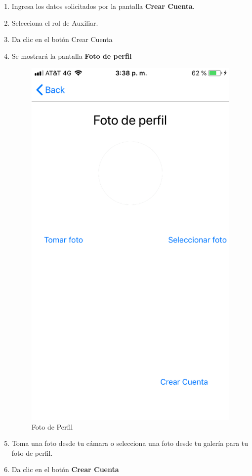 \begin{enumerate}
	\item Ingresa los datos solicitados por la pantalla \textbf{Crear Cuenta}.
	
	\item Selecciona el rol de Auxiliar.
	
	\item Da clic en el botón Crear Cuenta
	
	\item Se mostrará la pantalla \textbf{Foto de perfil}
	\newpage
	\begin{figure}[!htbp]			
		\hypertarget{fig:fotoPerfil}{\hspace{1pt}}
		\begin{center}
			\includegraphics[height=0.4\textheight]{Paciente/RegistrodeCuenta/images/IMG-3182}
			\caption{Foto de Perfil}
			\label{fig:fotoPerfil}
		\end{center}
	\end{figure}

	\item Toma una foto desde tu cámara o selecciona una foto desde tu galería para tu foto de perfil.
	
	\item Da clic en el botón \textbf{Crear Cuenta}

\end{enumerate}

